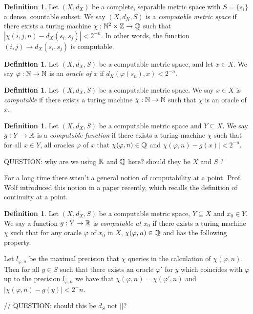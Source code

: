 \documentclass[11pt, reqno]{amsart}
\theoremstyle{plain}
\theoremstyle{definition}
\newtheorem{defn}[thm]{Definition}
\begin{document}
\begin{defn}   
    Let $(X, d_X)$ be a complete, separable metric space with $S = \{s_i\}$ a dense, countable subset. We say $(X, d_X, S)$ is a \textit{computable metric space} if there exists a turing machine $\chi: \mathbb{N}^2 \times \mathbb{Z} \rightarrow \mathbb{Q}$ such that $|\chi(i,j,n) - d_X(s_i, s_j)| < 2^{-n}$. In other words, the function $(i,j) \rightarrow d_X(s_i, s_j)$ is computable.
\end{defn}

\begin{defn}  
    Let $(X, d_X, S)$ be a computable metric space, and let $x \in X$. We say $\varphi: \mathbb{N} \rightarrow \mathbb{N}$ is an \textit{oracle of $x$} if $d_X(\varphi(s_n), x) < 2^{-n}$.  
\end{defn}

\begin{defn}
    Let $(X, d_X, S)$ be a computable metric space. We say $x \in X$ is \textit{computable} if there exists a turing machine $\chi: \mathbb{N} \rightarrow \mathbb{N}$ such that $\chi$ is an oracle of $x$.
\end{defn}


\begin{defn}
    Let $(X, d_X, S)$ be a computable metric space and $Y \subseteq X$. We say  $g: Y \rightarrow \mathbb{R}$ is a \textit{computable function} if there exists a turing machine $\chi$ such that for all $x \in Y$, all oracles $\varphi$ of $x$ that $\chi(\varphi, n) \in \mathbb{Q}$ and $\chi(\varphi,n) - g(x)| < 2^{-n}$.
\end{defn}

QUESTION: why are we using $\mathbb{R}$ and $\mathbb{Q}$ here? should they be $X$ and $S$ ?

For a long time there wasn't a general notion of computability at a point. Prof. Wolf introduced this notion in a paper recently, which recalls the definition of continuity at a point. 

\begin{defn}
    Let  $(X, d_X, S)$ be a computable metric space, $Y \subseteq X$ and $x_0 \in Y$. We say a function $g: Y \rightarrow \mathbb{R}$ is \textit{computable at $x_0$} if there exists a turing machine $\chi$ such that for any oracle $\varphi$ of $x_0$ in $X$, $\chi(\varphi, n) \in \mathbb{Q}$ and has the following property. 
    
    Let $l_{\varphi,n}$ be the maximal precision that $\chi$ queries in the calculation of $\chi(\varphi, n)$. Then for all $y \in S$ such that there exists an oracle $\varphi'$ for $y$ which coincides with $\varphi$ up to the precision $l_{\varphi, n}$ we have that $\chi(\varphi, n) = \chi(\varphi', n)$ and $|\chi(\varphi, n) - g(y)| < 2^-n$.

    // QUESTION: should this be $d_S$ not $||$?
\end{defn}






\printbibliography
\end{document}

